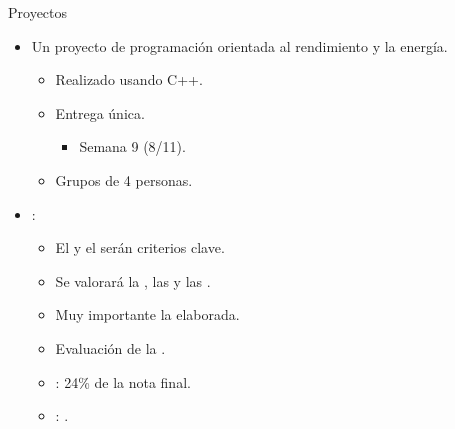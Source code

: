 \begin{frame}[t]{Proyectos}
\begin{itemize}
  \item Un proyecto de programación orientada al rendimiento y la energía.
    \begin{itemize}
      \item Realizado usando C++.
      \item Entrega única.
        \begin{itemize}
          \item Semana 9 (8/11).
        \end{itemize}
      \item Grupos de 4 personas.
    \end{itemize}

  \item {}:
    \begin{itemize}
      \item El  y el  serán criterios clave.
      \item Se valorará la , las 
             y las .
      \item Muy importante la  elaborada.
      \item Evaluación de la .
      \item {}: 24\% de la nota final.
      \item {}: .
    \end{itemize}
\end{itemize}
\end{frame}

